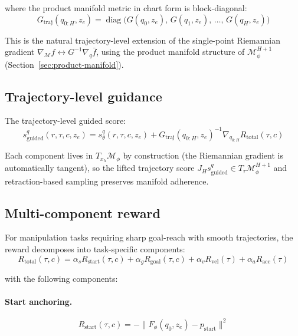 \documentclass[11pt,a4paper]{article}
\newcommand{\Mphi}{\mathcal{M}_{\phi}}
\newcommand{\Mset}{\mathcal{M}}
\begin{document}
where the product manifold metric in chart form is block-diagonal:
\begin{equation}
G_{\text{traj}}(q_{0:H}, z_e) = \operatorname{diag}\bigl(G(q_0, z_e), \, G(q_1, z_e), \, \ldots, \, G(q_H, z_e)\bigr)
\end{equation}

This is the natural trajectory-level extension of the single-point Riemannian gradient $\nabla_{\Mset} f \leftrightarrow G^{-1} \nabla_q \bar f$, using the product manifold structure of $\Mphi^{H+1}$ (Section~\ref{sec:product-manifold}).

\subsection{Trajectory-level guidance}

The trajectory-level guided score:
\begin{equation}
\boxed{ s_{\text{guided}}^q(r, \tau, c, z_e) = s_\theta^q(r, \tau, c, z_e) + G_{\text{traj}}(q_{0:H}, z_e)^{-1} \nabla_{q_{0:H}} R_{\text{total}}(\tau, c) }
\end{equation}

Each component lives in $T_{x_h} \Mphi$ by construction (the Riemannian gradient is automatically tangent), so the lifted trajectory score $J_H s_{\text{guided}}^q \in T_\tau \Mphi^{H+1}$ and retraction-based sampling preserves manifold adherence.

\subsection{Multi-component reward}

For manipulation tasks requiring sharp goal-reach with smooth trajectories, the reward decomposes into task-specific components:
\begin{equation}
R_{\text{total}}(\tau, c) = \alpha_s R_{\text{start}}(\tau, c) + \alpha_g R_{\text{goal}}(\tau, c) + \alpha_v R_{\text{vel}}(\tau) + \alpha_a R_{\text{acc}}(\tau)
\end{equation}

with the following components:

\paragraph{Start anchoring.}
\begin{equation}
R_{\text{start}}(\tau, c) = -\| F_\phi(q_0, z_e) - p_{\text{start}} \|^2
\end{equation}
\end{document}
